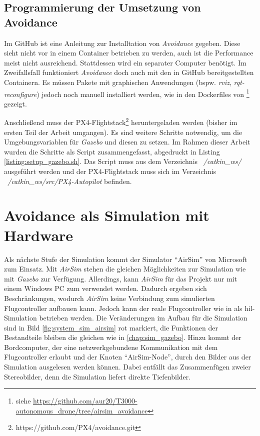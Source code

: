 \subsection*{Programmierung der Umsetzung von Avoidance}
Im GitHub\cite{dronecodestiftungObstacleDetectionAvoidance2023} ist eine Anleitung zur Installtation von \textit{Avoidance} gegeben. Diese sieht nicht vor in einem Container betrieben zu werden, auch ist die Performance meist nicht ausreichend. Stattdessen wird ein separater Computer benötigt. Im Zweifallsfall funktioniert \textit{Avoidance} doch auch mit den in GitHub bereitgestellten Containern. Es müssen Pakete mit graphischen Anwendungen (bspw. \textit{rviz}, \textit{rqt-reconfigure}) jedoch noch manuell installiert werden, wie in den Dockerfiles von \cite[Kapitel 5]{markusreinErweiterungBestehenderDrohnen2023}\footnote{siehe \url{https://github.com/aur20/T3000-autonomous_drone/tree/airsim_avoidance}} gezeigt.

Anschließend muss der PX4-Flightstack\footnote{https://github.com/PX4/avoidance.git} heruntergeladen werden (bisher im ersten Teil der Arbeit umgangen). Es sind weitere Schritte notwendig, um die Umgebungsvariablen für \textit{Gazebo} und diesen zu setzen. Im Rahmen dieser Arbeit wurden die Schritte als Script zusammengefasst, abgedruckt in Listing \ref{listing:setup_gazebo.sh}. Das Script muss aus dem Verzeichnis \textit{~/catkin\_ws/} ausgeführt werden und der PX4-Flightstack muss sich im Verzeichnis \textit{~/catkin\_ws/src/PX4-Autopilot} befinden.

\section{Avoidance als Simulation mit Hardware}
Als nächste Stufe der Simulation kommt der Simulator \enquote{AirSim} von Microsoft zum Einsatz. Mit \textit{AirSim} stehen die gleichen Möglichkeiten zur Simulation wie mit \textit{Gazebo} zur Verfügung. Allerdings, kann \textit{AirSim} für das Projekt nur mit einem Windows PC zum verwendet werden. Dadurch ergeben sich Beschränkungen, wodurch \textit{AirSim} keine Verbindung zum simulierten Flugcontroller aufbauen kann. Jedoch kann der reale Flugcontroller wie in \cite[Kapitel 5]{markusreinErweiterungBestehenderDrohnen2023} als \gls{hil}-Simulation betrieben werden. Die Veränderungen im Aufbau für die Simulation sind in Bild \ref{fig:system_sim_airsim} rot markiert, die Funktionen der Bestandteile bleiben die gleichen wie in \cref{chap:sim_gazebo}. Hinzu kommt der Bordcomputer, der eine netzwerkgebundene Kommunikation mit dem Flugcontroller erlaubt und der Knoten \enquote{AirSim-Node}, durch den Bilder aus der Simulation ausgelesen werden können. Dabei entfällt das Zusammenfügen zweier Stereobilder, denn die Simulation liefert direkte Tiefenbilder.

